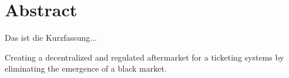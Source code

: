 \chapter*{Abstract}


Das ist die Kurzfassung...



Creating a decentralized and regulated aftermarket for a ticketing systems by eliminating the emergence of a black market. 